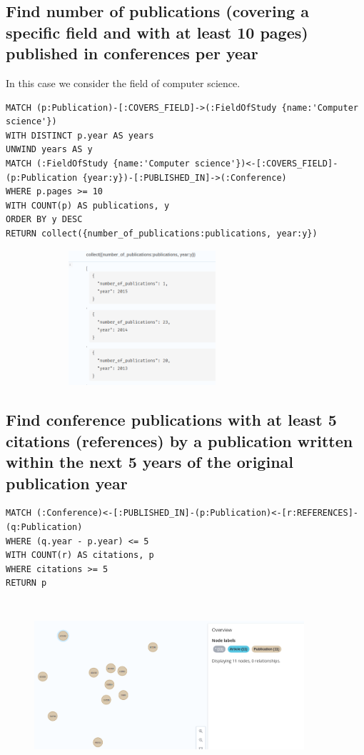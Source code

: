 \documentclass{Configuration_Files/PoliMi3i_thesis}
\begin{document}
\subsection{Find number of publications (covering a specific field and with at least 10 pages) published in conferences per year}
In this case we consider the field of computer science.\\
\begin{lstlisting}[language=cypher, label=lst:cypher-example]
MATCH (p:Publication)-[:COVERS_FIELD]->(:FieldOfStudy {name:'Computer science'})
WITH DISTINCT p.year AS years
UNWIND years AS y
MATCH (:FieldOfStudy {name:'Computer science'})<-[:COVERS_FIELD]-(p:Publication {year:y})-[:PUBLISHED_IN]->(:Conference)
WHERE p.pages >= 10
WITH COUNT(p) AS publications, y
ORDER BY y DESC
RETURN collect({number_of_publications:publications, year:y})
\end{lstlisting}
\begin{figure}[H]
    \centering
    \includegraphics[width=80mm,height=50mm]{Images/query_2.png}
        \caption{}
    \label{fig:quadtree}
\end{figure}
\subsection{Find conference publications with at least 5 citations (references) by a publication written within the next 5 years of the original publication year}
\begin{lstlisting}[language=cypher, label=lst:cypher-example]
MATCH (:Conference)<-[:PUBLISHED_IN]-(p:Publication)<-[r:REFERENCES]-(q:Publication)
WHERE (q.year - p.year) <= 5
WITH COUNT(r) AS citations, p
WHERE citations >= 5
RETURN p
\end{lstlisting}
\begin{figure}[H]
    \centering
    \includegraphics[width=100mm, height=63mm]{Images/query_3.png}
        \caption{}
    \label{fig:quadtree}
\end{figure}
\end{document}
